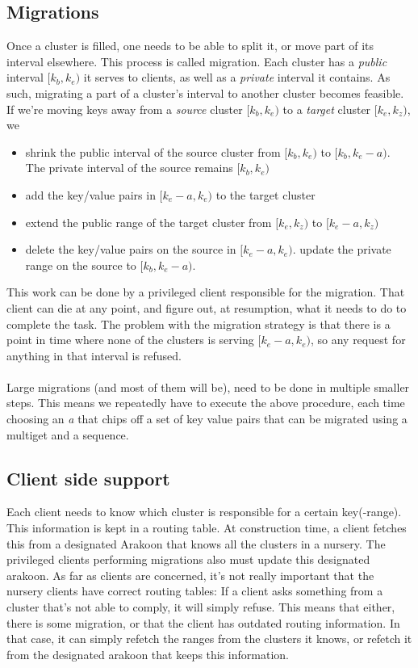\subsection{Migrations}
Once a cluster is filled, one needs to be able to split it, or move part of its interval elsewhere. 
This process is called migration.
Each cluster has a \emph{public} interval $[k_b,k_e)$ it serves to clients, 
as well as a \emph{private} interval it contains. 
As such, migrating a part of a cluster's interval to another cluster becomes feasible. 
If we're moving keys away from a \emph{source} cluster $[k_b, k_e)$ 
to a \emph{target} cluster $[k_e, k_z)$, we
\begin{itemize}
\item{} shrink the public interval of the source cluster from 
$[k_b, k_e)$ to $[k_b, k_e - a)$. 
The private interval of the source remains $[k_b, k_e)$
\item{} add the key/value pairs in $[k_e - a,k_e)$ to the target cluster
\item{} extend the public range of the target cluster from
$[k_e,k_z)$ to $[k_e - a, k_z)$
\item{} delete the key/value pairs on the source in $[k_e -a,k_e)$.
        update the private range on the source to $[k_b, k_e-a)$.
\end{itemize}
This work can be done by a privileged client responsible for the migration. 
That client can die at any point, and figure out, at resumption, what it needs to do to complete the task. 
The problem with the migration strategy is that there is a point in time where none of the clusters is serving $[k_e -a, k_e)$, so any request for anything in that interval is refused.
\paragraph{}
Large migrations (and most of them will be), need to be done in multiple smaller steps.
This means we repeatedly have to execute the above procedure, 
each time choosing an \emph{a} that chips off a set of key value pairs that can be migrated using a multiget and a sequence.

\subsection{Client side support}
Each client needs to know which cluster is responsible for a certain key(-range). 
This information is kept in a routing table. At construction time, a client fetches this from a designated Arakoon that knows all the clusters in a nursery. 
The privileged clients performing migrations also must update this designated arakoon. 
As far as clients are concerned, it's not really important that the nursery clients have correct routing tables: 
If a client asks something from a cluster that's not able to comply, it will simply refuse. 
This means that either, there is some migration, or that the client has outdated routing information. 
In that case, it can simply refetch the ranges from the clusters it knows, or refetch it from the designated arakoon that keeps this information.
